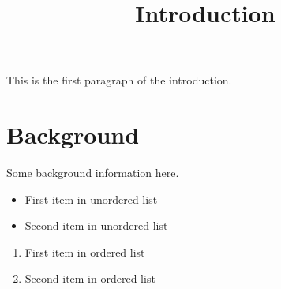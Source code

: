 \documentclass[11pt,a4paper]{article}
\title{Introduction}
\begin{document}
\maketitle

This is the first paragraph of the introduction.

\section{Background}

Some background information here.

\begin{itemize}
\item First item in unordered list
\item Second item in unordered list
\end{itemize}

\begin{enumerate}
\item First item in ordered list
\item Second item in ordered list
\end{enumerate}
\end{document}
